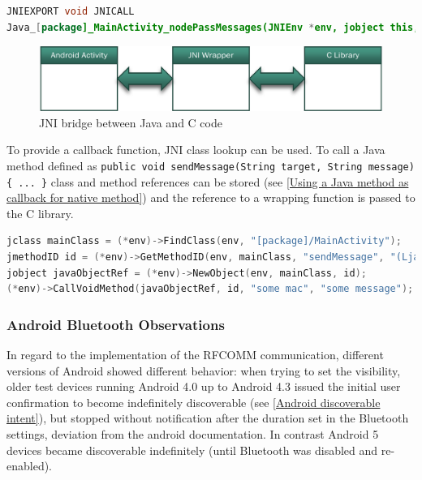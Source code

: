 \begin{lstlisting}[language=Java, caption={Function implementation in node\_wrapper.c}, label={Function implementation in node_wrapper.c}, float, floatplacement=H]
JNIEXPORT void JNICALL
Java_[package]_MainActivity_nodePassMessages(JNIEnv *env, jobject this, jstring source, jstring message) { ... }
\end{lstlisting}

\begin{figure}[!htbp] %
	\caption{\gls{JNI} bridge between Java and C code} \label{JNI bridge between Java and C code}
	\includegraphics[scale=1.0]{figures/jni_wrapper.png}
\end{figure}

To provide a callback function, \gls{JNI} class lookup can be used. To call a Java method defined as \lstinline|public void sendMessage(String target, String message){ ... }| class and method references can be stored (see \autoref{Using a Java method as callback for native method}) and the reference to a wrapping function is passed to the C library.

\begin{lstlisting}[language=C, caption={Using a Java method as callback for native method}, label={Using a Java method as callback for native method}, float, floatplacement=H]
    jclass mainClass = (*env)->FindClass(env, "[package]/MainActivity");
jmethodID id = (*env)->GetMethodID(env, mainClass, "sendMessage", "(Ljava/lang/String;Ljava/lang/String;)V");
jobject javaObjectRef = (*env)->NewObject(env, mainClass, id);
(*env)->CallVoidMethod(javaObjectRef, id, "some mac", "some message");
\end{lstlisting}

\subsubsection{Android Bluetooth Observations} \label{Android Bluetooth Observations}

In regard to the implementation of the \gls{RFCOMM} communication, different versions of Android showed different behavior: when trying to set the visibility, older test devices running Android 4.0 up to Android 4.3 issued the initial user confirmation to become indefinitely discoverable (see \autoref{Android discoverable intent}), but stopped without notification after the duration set in the Bluetooth settings, deviation from the android documentation. In contrast Android 5 devices became discoverable indefinitely (until Bluetooth was disabled and re-enabled). 


